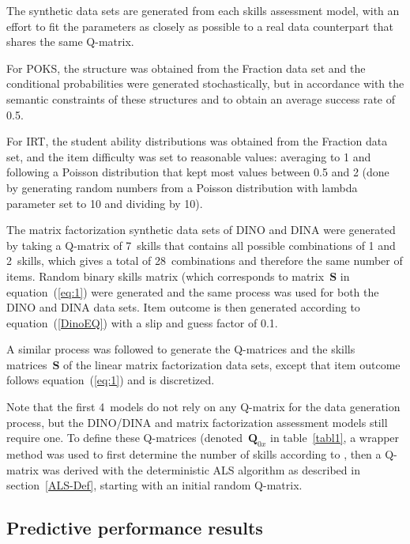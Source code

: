 The synthetic data sets are generated from each skills assessment model, with an effort to fit the parameters as closely as possible to a real data counterpart that shares the same Q-matrix.  

For POKS, the structure was obtained from the Fraction data set and the conditional probabilities were generated stochastically, but in accordance with the semantic constraints of these structures and to obtain an average success rate of 0.5.

For IRT, the student ability distributions was obtained from the Fraction data set, and the item difficulty was set to reasonable values: averaging to 1 and following a Poisson distribution that kept most values between 0.5 and 2 (done by generating random numbers from a Poisson distribution with lambda parameter set to 10 and dividing by 10). 

The matrix factorization synthetic data sets of DINO and DINA were generated by taking a Q-matrix of 7~skills that contains all possible combinations of 1 and 2~skills, which gives a total of 28~combinations and therefore the same number of items.  Random binary skills matrix (which corresponds to matrix~$\mathbf{S}$ in equation~(\ref{eq:1}) were generated and the same process was used for both the DINO and DINA data sets.  Item outcome is then generated according to equation~(\ref{DinoEQ}) with a slip and guess factor of 0.1.

A similar process was followed to generate the Q-matrices and the skills matrices~$\mathbf{S}$ of the linear matrix factorization data sets, except that item outcome follows equation~(\ref{eq:1}) and is discretized.


Note that the first 4~models do not rely on any Q-matrix for the data generation process, but the DINO/DINA and matrix factorization assessment models still require one.  To define these Q-matrices (denoted~$\mathbf{Q}_{0x}$ in table~\ref{tabl1}, a wrapper method was used to first determine the number of skills according to \citep{Beheshti2012Numbers}, then a Q-matrix was derived with the deterministic ALS algorithm as described in section~\ref{ALS-Def}, starting with an initial random Q-matrix.


\subsection{Predictive performance results} \label{secSyn}

